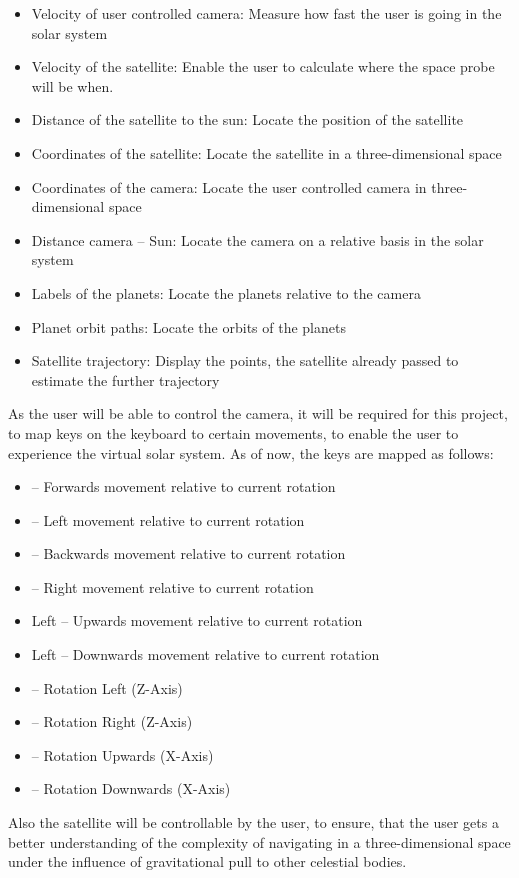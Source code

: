 \documentclass[conference,compsoc]{IEEEtran}
\begin{document}
\begin{itemize}
	\item Velocity of user controlled camera: Measure how fast the user is going in the solar system
	\item Velocity of the satellite: Enable the user to calculate where the space probe will be when.
	\item Distance of the satellite to the sun: Locate the position of the satellite
	\item Coordinates of the satellite: Locate the satellite in a three-dimensional space
	\item Coordinates of the camera: Locate the user controlled camera in three-dimensional space
	\item Distance camera – Sun: Locate the camera on a relative basis in the solar system
	\item Labels of the planets: Locate the planets relative to the camera
	\item Planet orbit paths: Locate the orbits of the planets
	\item Satellite trajectory: Display the points, the satellite already passed to estimate the further trajectory
\end{itemize}
As the user will be able to control the camera, it will be required for this project, to map keys on the keyboard to certain movements, to enable the user to experience the virtual solar system. As of now, the keys are mapped as follows:
\begin{itemize}
	\item {} – Forwards movement relative to current rotation
	\item {} – Left movement relative to current rotation
	\item {} – Backwards movement relative to current rotation
	\item {} – Right movement relative to current rotation
	\item Left \keys{\shift} – Upwards movement relative to current rotation
	\item Left \keys{\ctrl} – Downwards movement relative to current rotation
	\item \keys{\arrowkeyleft} – Rotation Left (Z-Axis)
	\item \keys{\arrowkeyright} – Rotation Right (Z-Axis)
	\item \keys{\arrowkeyup} – Rotation Upwards (X-Axis)
	\item \keys{\arrowkeydown} – Rotation Downwards (X-Axis)
\end{itemize}
Also the  satellite will be controllable by the user, to ensure, that the user gets a better understanding of the complexity of navigating in a three-dimensional space under the influence of gravitational pull to other celestial bodies. 
\end{document}
